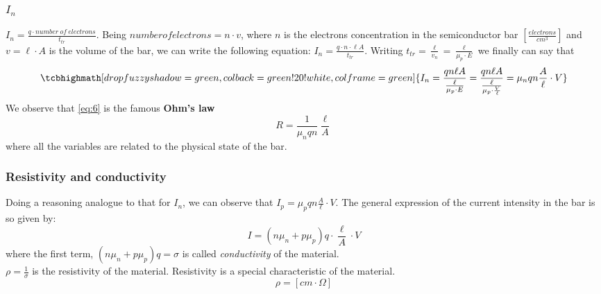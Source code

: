 \documentclass[12pt]{article}
\newcommand{\B}{\textbf}
\newcommand{\I}{\textit}
\begin{document}
\subsubsection{$I_n$}
$I_n = \frac{q \cdot number \ of \ electrons}{t_{tr}}$. Being $number of electrons = n \cdot v$, where $n$ is the electrons concentration in the semiconductor bar $[\frac{electrons}{cm^3}]$ and $v= \ell \cdot A$ is the volume of the bar, we can write the following equation: $I_n = \frac{q \cdot n \cdot \ell A}{t_{tr}}$. Writing $t_{tr} = \frac{\ell}{v_n} = \frac{\ell}{\mu_p \cdot E}$ we finally can say that
\begin{equation} \label{eq:6}
\tcbhighmath[drop fuzzy shadow = green, colback = green!20!white, colframe = green]{
	I_n = \frac{q n \ell A}{\frac{\ell}{\mu_p \cdot E}} = \frac{q n \ell A}{\frac{\ell}{\mu_p \cdot \frac{V}{\ell}}}= \mu_n qn\frac{A}{\ell}\cdot V}
\end{equation}
We observe that \ref{eq:6} is the famous \B{Ohm's law} 
\begin{equation}
	R = \frac{1}{\mu_n q n}\frac{\ell}{A}
\end{equation}
where all the variables are related to the physical state of the bar.
\subsubsection{Resistivity and conductivity}
Doing a reasoning analogue to that for $I_n$, we can observe that $I_p = \mu_p qn\frac{A}{\ell}\cdot V$. The general expression of the current intensity in the bar is so given by:
\begin{equation}
	I = (n\mu_n+p\mu_p)q\cdot \frac{\ell}{A} \cdot V
\end{equation}
where the first term, $(n\mu_n+p\mu_p)q = \sigma $ is called \I{conductivity} of the material.\\
$\rho = \frac{1}{\sigma}$ is the resistivity of the material. 
Resistivity is a special characteristic of the material. 
\begin{equation}
	\rho = [cm \cdot \Omega]
\end{equation}
\end{document}
